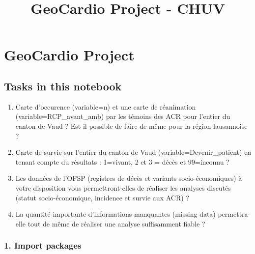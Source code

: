 \documentclass[11pt]{article}
\title{GeoCardio Project - CHUV }
\providecommand{\tightlist}{%
      \setlength{\itemsep}{0pt}\setlength{\parskip}{0pt}}
\begin{document}
    
    
    \maketitle
    
    

    
    \hypertarget{geocardio-project}{%
\section{GeoCardio Project}\label{geocardio-project}}

    \hypertarget{tasks-in-this-notebook}{%
\subsection{Tasks in this notebook}\label{tasks-in-this-notebook}}

\begin{enumerate}
\def\labelenumi{\arabic{enumi}.}
\tightlist
\item
  Carte d'occurence (variable=n) et une carte de réanimation
  (variable=RCP\_avant\_amb) par les témoins des ACR pour l'entier du
  canton de Vaud ? Est-il possible de faire de même pour la région
  lausannoise ?
\item
  Carte de survie sur l'entier du canton de Vaud
  (variable=Devenir\_patient) en tenant compte du résultats : 1=vivant,
  2 et 3 = décès et 99=inconnu ?
\item
  Les données de l'OFSP (registres de décès et variants
  socio-économiques) à votre disposition vous permettront-elles de
  réaliser les analyses discutés (statut socio-économique, incidence et
  survie aux ACR) ?
\item
  La quantité importante d'informations manquantes (missing data)
  permettra-elle tout de même de réaliser une analyse suffisamment
  fiable ?
\end{enumerate}

    \hypertarget{import-packages}{%
\subsubsection{1. Import packages}\label{import-packages}}
\end{document}
